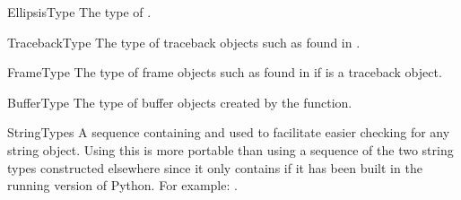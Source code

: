\begin{datadesc}{EllipsisType}
The type of .
\end{datadesc}

\begin{datadesc}{TracebackType}
The type of traceback objects such as found in
.
\end{datadesc}

\begin{datadesc}{FrameType}
The type of frame objects such as found in  if
 is a traceback object.
\end{datadesc}

\begin{datadesc}{BufferType}
The type of buffer objects created by the
 function.
\end{datadesc}

\begin{datadesc}{StringTypes}
A sequence containing  and  used to
facilitate easier checking for any string object.  Using this is more
portable than using a sequence of the two string types constructed
elsewhere since it only contains  if it has been
built in the running version of Python.  For example:
.
\end{datadesc}
